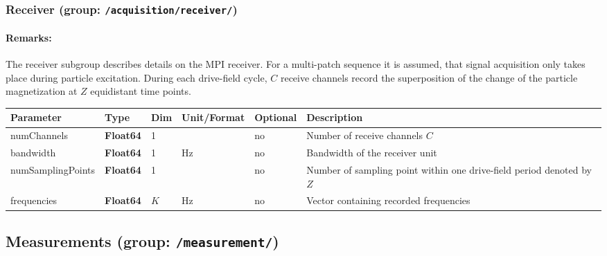 \documentclass[landscape]{article} %
\newcommand{\inl}[1]{\lstinline[columns=fixed]{#1}}
\newcommand{\inltab}[1]{{\ttfamily\bfseries\color{blue}#1}}
\newcommand{\inlvar}[1]{{\ttfamily#1}}
\begin{document}
\subsubsection{Receiver (group: \inl{/acquisition/receiver/})}

\begin{multicols}{2}

\paragraph{Remarks:} The receiver subgroup describes details on the MPI receiver. For a multi-patch sequence it is assumed, that signal acquisition only takes place during particle excitation. During each drive-field cycle, $C$ receive channels record the superposition of the change of the particle magnetization at $Z$ equidistant time points.

\end{multicols}


\noindent \begin{tabularx}{\columnwidth}{lllllX} 
\textbf{Parameter} & \textbf{Type} & \textbf{Dim} & \textbf{Unit/Format} & \textbf{Optional} & \textbf{Description} \\ \hline 
\inlvar{numChannels} & \inltab{Float64} & 1 & & no & Number of receive channels $C$ \\ \hline 
\inlvar{bandwidth} & \inltab{Float64} & 1 & Hz & no & Bandwidth of the receiver unit \\ \hline
\inlvar{numSamplingPoints} & \inltab{Float64} & 1 &  & no & Number of sampling point within one drive-field period denoted by $Z$ \\ \hline
\inlvar{frequencies} & \inltab{Float64} & $K$ & Hz & no & Vector containing recorded frequencies \\ \hline
\end{tabularx}


\subsection{Measurements (group: \inl{/measurement/})}
\end{document}
